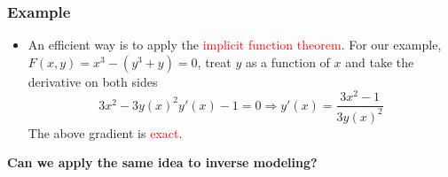 \documentclass[usenames,dvipsnames]{beamer}
\begin{document}
\begin{frame}
	\frametitle{Example}
	
	\begin{itemize}
		\item An efficient way is to apply the \textcolor{red}{implicit function theorem}. For our example, $F(x,y)=x^3-(y^3+y)=0$, treat $y$ as a function of $x$ and take the derivative on both sides
		$$3x^2 - 3y(x)^2y'(x)-1=0\Rightarrow y'(x) = \frac{3x^2-1}{3y(x)^2}$$
	The above gradient is \textcolor{red}{exact}.
	\end{itemize}
	\begin{center}
			\textbf{Can we apply the same idea to inverse modeling?}
	\end{center}

\end{frame}
\end{document}
